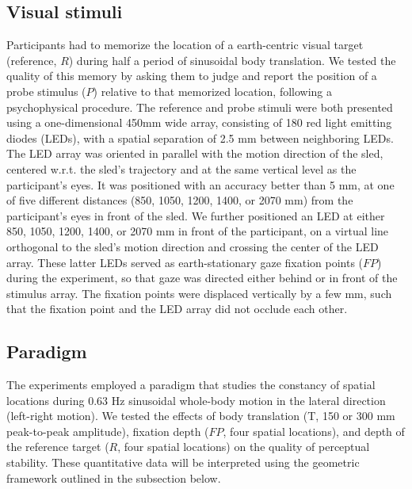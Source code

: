 \subsection{Visual stimuli}

Participants had to memorize the location of a earth-centric visual target (reference, $R$) during half a period of sinusoidal body translation. We tested the quality of this memory by asking them to judge and report the position of a probe stimulus ($P$) relative to that memorized location, following a psychophysical procedure. The reference and probe stimuli were both presented using a one-dimensional 450mm wide array, consisting of 180 red light emitting diodes (LEDs), with a spatial separation of 2.5 mm between neighboring LEDs. The LED array was oriented in parallel with the motion direction of the sled, centered w.r.t. the sled's trajectory and at the same vertical level as the participant's eyes. It was positioned with an accuracy better than 5 mm, at one of five different distances (850, 1050, 1200, 1400, or 2070 mm) from the participant's eyes in front of the sled. We further positioned an LED at either 850, 1050, 1200, 1400, or 2070 mm in front of the participant, on a virtual line orthogonal to the sled's motion direction and crossing the center of the LED array. These latter LEDs served as earth-stationary gaze fixation points ($FP$) during the experiment, so that gaze was directed either behind or in front of the stimulus array. The fixation points were displaced vertically by a few mm, such that the fixation point and the LED array did not occlude each other.

\subsection{Paradigm}

The experiments employed a paradigm that studies the constancy of spatial locations during 0.63 Hz sinusoidal whole-body motion in the lateral direction (left-right motion). We tested the effects of body translation (T, 150 or 300 mm peak-to-peak amplitude), fixation depth ($FP$, four spatial locations), and depth of the reference target ($R$, four spatial locations) on the quality of perceptual stability. These quantitative data will be interpreted using the geometric framework outlined in the subsection  below.

